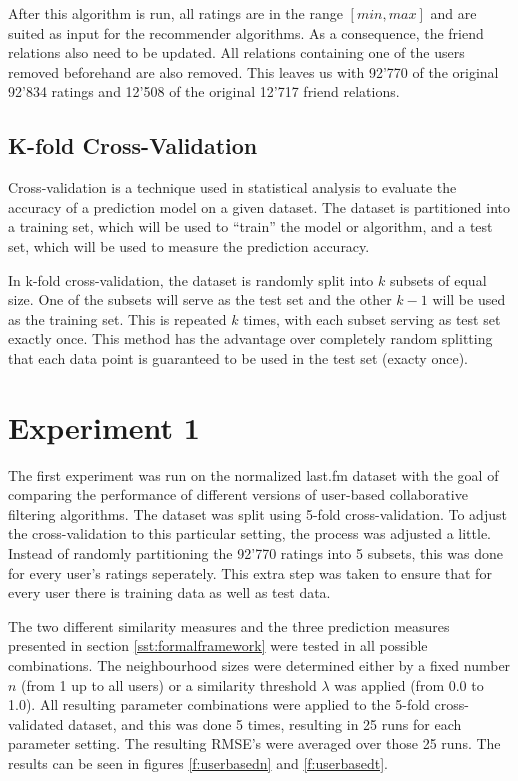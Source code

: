After this algorithm is run, all ratings are in the range $[min,max]$ and are suited as input for the recommender algorithms. As a consequence, the friend relations also need to be updated. All relations containing one of the users removed beforehand are also removed. This leaves us with 92'770 of the original 92'834 ratings and 12'508 of the original 12'717 friend relations.

\subsection{K-fold Cross-Validation}
\label{kfoldcrossvalidation} Cross-validation is a technique used in statistical analysis to evaluate the accuracy of a prediction model on a given dataset. The dataset is partitioned into a training set, which will be used to ``train'' the model or algorithm, and a test set, which will be used to measure the prediction accuracy.

In k-fold cross-validation, the dataset is randomly split into $k$ subsets of equal size. One of the subsets will serve as the test set and the other $k-1$ will be used as the training set. This is repeated $k$ times, with each subset serving as test set exactly once. This method has the advantage over completely random splitting that each data point is guaranteed to be used in the test set (exacty once).
\section{Experiment 1}
\label{st:experiment1} The first experiment was run on the normalized last.fm dataset with the goal of comparing the performance of different versions of user-based collaborative filtering algorithms. The dataset was split using 5-fold cross-validation. To adjust the cross-validation to this particular setting, the process was adjusted a little. Instead of randomly partitioning the 92'770 ratings into 5 subsets, this was done for every user's ratings seperately. This extra step was taken to ensure that for every user there is training data as well as test data.

The two different similarity measures and the three prediction measures presented in section \ref{sst:formalframework} were tested in all possible combinations. The neighbourhood sizes were determined either by a fixed number $n$ (from 1 up to all users) or a similarity threshold $\lambda$ was applied (from 0.0 to 1.0). All resulting parameter combinations were applied to the 5-fold cross-validated dataset, and this was done 5 times, resulting in 25 runs for each parameter setting. The resulting RMSE's were averaged over those 25 runs. The results can be seen in figures \ref{f:userbasedn} and \ref{f:userbasedt}.

